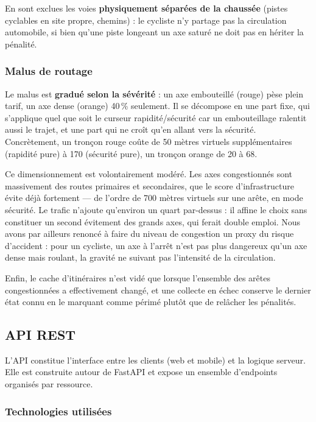 En sont exclues les voies \textbf{physiquement séparées de la chaussée} (pistes cyclables en site propre, chemins) : le cycliste n'y partage pas la circulation automobile, si bien qu'une piste longeant un axe saturé ne doit pas en hériter la pénalité.

\subsubsection{Malus de routage}

Le malus est \textbf{gradué selon la sévérité} : un axe embouteillé (rouge) pèse plein tarif, un axe dense (orange) 40\,\% seulement. Il se décompose en une part fixe, qui s'applique quel que soit le curseur rapidité/sécurité car un embouteillage ralentit aussi le trajet, et une part qui ne croît qu'en allant vers la sécurité. Concrètement, un tronçon rouge coûte de 50 mètres virtuels supplémentaires (rapidité pure) à 170 (sécurité pure), un tronçon orange de 20 à 68.

Ce dimensionnement est volontairement modéré. Les axes congestionnés sont massivement des routes primaires et secondaires, que le score d'infrastructure évite déjà fortement — de l'ordre de 700 mètres virtuels sur une arête, en mode sécurité. Le trafic n'ajoute qu'environ un quart par-dessus : il affine le choix sans constituer un second évitement des grands axes, qui ferait double emploi. Nous avons par ailleurs renoncé à faire du niveau de congestion un proxy du risque d'accident : pour un cycliste, un axe à l'arrêt n'est pas plus dangereux qu'un axe dense mais roulant, la gravité ne suivant pas l'intensité de la circulation.

Enfin, le cache d'itinéraires n'est vidé que lorsque l'ensemble des arêtes congestionnées a effectivement changé, et une collecte en échec conserve le dernier état connu en le marquant comme périmé plutôt que de relâcher les pénalités.

\subsection{API REST}

L'API constitue l'interface entre les clients (web et mobile) et la logique serveur. Elle est construite autour de FastAPI et expose un ensemble d'endpoints organisés par ressource.

\subsubsection{Technologies utilisées}


